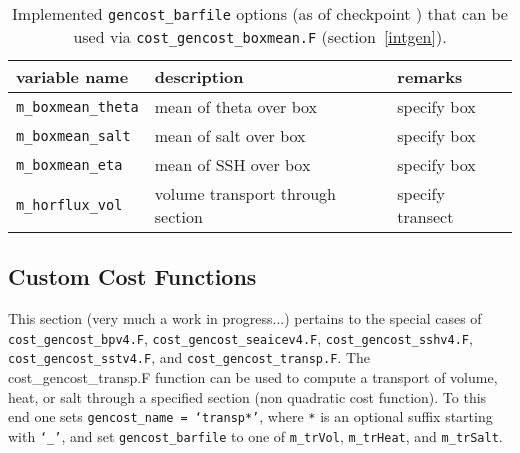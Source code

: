 \begin{table}[!ht]
\centering
\begin{tabular}{lll}
variable name				&	description						&	remarks \\ \hline\hline
\texttt{m\_boxmean\_theta}	&	mean of theta over box			& specify box \\
\texttt{m\_boxmean\_salt}		&	mean of salt over box			& specify box \\
\texttt{m\_boxmean\_eta}		&	mean of SSH over box			& specify box \\
\hline
\texttt{m\_horflux\_vol}		&	volume transport through section	& specify transect \\ 
\end{tabular}
\caption{Implemented \texttt{gencost\_barfile} options (as of checkpoint \mitgcmCheckpointVersion) that can be used via \texttt{cost\_gencost\_boxmean.F} (section~\ref{intgen}).}
\label{tbl:genint_ecco_barfile}
\end{table}

\subsection{Custom Cost Functions} \label{v4custom}

This section (very much a work in progress...) pertains to the special cases of \texttt{cost\_gencost\_bpv4.F}, \texttt{cost\_gencost\_seaicev4.F}, \texttt{cost\_gencost\_sshv4.F}, \texttt{cost\_gencost\_sstv4.F}, and \texttt{cost\_gencost\_transp.F}. The cost\_gencost\_transp.F function can be used to compute a transport of volume, heat, or salt through a specified section (non quadratic cost function). To this end one sets \texttt{gencost\_name = `transp*'}, where \texttt{*} is an optional suffix starting with \texttt{`\_'}, and set \texttt{gencost\_barfile} to one of \texttt{m\_trVol}, \texttt{m\_trHeat}, and \texttt{m\_trSalt}. 

